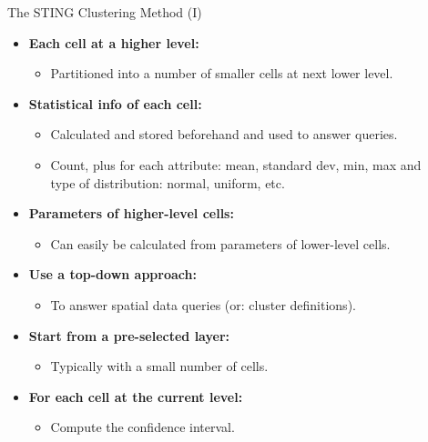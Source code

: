 \begin{frame}{The STING Clustering Method (I)}
	\begin{itemize}
		\item \textbf{Each cell at a higher level:}
		\begin{itemize}
			\item Partitioned into a number of smaller cells at next lower 
			level.
		\end{itemize}
		\item \textbf{Statistical info of each cell:}
		\begin{itemize}
			\item Calculated and stored beforehand and used to answer queries.
			\item Count, plus for each attribute: mean, standard dev, min, max 
			and \\
			type of distribution: normal, uniform, etc.
		\end{itemize}
		\item \textbf{Parameters of higher-level cells:}
		\begin{itemize}
			\item Can easily be calculated from parameters of lower-level cells.
		\end{itemize}
		\item \textbf{Use a top-down approach:}
		\begin{itemize}
			\item To answer spatial data queries (or: cluster definitions).
		\end{itemize}
		\item \textbf{Start from a pre-selected layer:}
		\begin{itemize}
			\item Typically with a small number of cells.
		\end{itemize}
		\item \textbf{For each cell at the current level:}
		\begin{itemize}
			\item Compute the confidence interval.
		\end{itemize}
	\end{itemize}
\end{frame}

